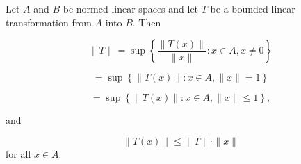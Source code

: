 Let $A$ and $B$ be normed linear spaces and let $T$ be a bounded linear transformation from $A$ into $B$. Then

$$\| T \| = \sup \left\{ \frac{\| T(x) \|}{\| x \|} : x \in A, x \neq 0 \right\}$$

$$= \sup \left\{ \| T(x) \| : x \in A, \| x \| = 1 \right\}$$

$$= \sup \left\{ \| T(x) \| : x \in A, \| x \| \leq 1 \right\},$$

and

$$\| T(x) \| \leq \| T \| \cdot \| x \|$$ for all $x \in A$.